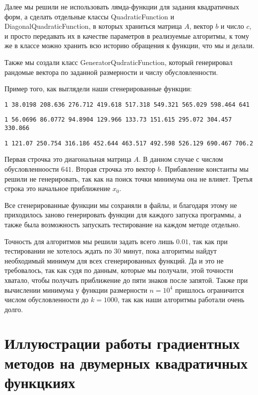  Далее мы решили не использовать лямда-функции для задания квадратичных форм, а сделать отдельные классы
QuadraticFunction и \newline DiagonalQuadraticFunction, в которых храниться матрица $A$, вектор $b$ и число $c$, и просто
передавать их в качестве параметров в реализуемые алгоритмы, к тому же в классе можно хранить всю историю
 обращения к функции, что мы и делали.

Также мы создали класс GeneratorQudraticFunction, который генерировал рандомые
 вектора по заданной размерности и числу обусловленности.

 Пример того, как выглядели наши сгенерированные функции:
\newline

\texttt{\small 1 38.0198 208.636 276.712 419.618 517.318 549.321 565.029 598.464 641 }

\texttt{\small 1 56.0696 86.0772 94.8904 129.966 133.73 151.615 295.072 304.457 330.866 }

\texttt{\small 1 121.07 250.754 316.186 452.644 463.517 492.598 526.129 690.467 706.2} 
\newline

Первая строчка это диагональная матрица $A$. В данном случае с числом обусловленноости $641$.
Вторая строчка это вектор $b$. Прибавление константы мы решили не генерировать, так как на поиск точки
минимума она не влияет. Третья строка это начальное приближение $x_0$. 

Все сгенерированные функции мы сохраняли в файлы,
и благодаря этому не приходилось заново генерировать функции для каждого запуска программы, а также была
возможность запускать тестирование на каждом методе отдельно. 

Точность для алгоритмов мы решили задать всего лишь $0.01$, так как при тестировании не хотелось ждать по 30 минут, пока
алгоритмы найдут необходимый минимум для всех сгенерированных функций. Да и это не требовалось, так как судя по
данным, которые мы получали, этой точности хватало, чтобы получать приближение до пяти знаков после запятой.
 Также при вычислении минимума 
у функции размерности
$n = 10^4$ пришлось ограничится числом обусловленности до $k = 1000$, так как наши алгоритмы работали очень долго.


\section{Иллуюстрации работы градиентных методов на двумерных квадратичных функцкиях}

